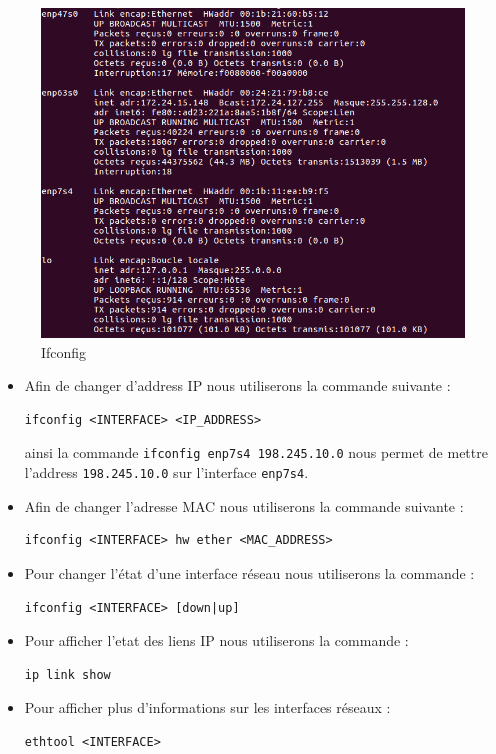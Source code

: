\begin{figure}[H]
\centering
\includegraphics[width=400pt]{./TP1/Pictures/ifconfig}
\caption{Ifconfig}
\label{Ifconfig}
\end{figure}

\begin{itemize}
\item Afin de changer d'address IP nous utiliserons la commande suivante :

\begin{verbatim}
ifconfig <INTERFACE> <IP_ADDRESS>
\end{verbatim}
ainsi la commande \texttt{ifconfig enp7s4 198.245.10.0} nous permet de mettre l'address \texttt{198.245.10.0} sur l'interface \texttt{enp7s4}.

\item Afin de changer l'adresse MAC nous utiliserons la commande suivante :
\begin{verbatim}
ifconfig <INTERFACE> hw ether <MAC_ADDRESS>
\end{verbatim}
\item Pour changer l'état d'une interface réseau nous utiliserons la commande :
\begin{verbatim}
ifconfig <INTERFACE> [down|up]
\end{verbatim}
\item Pour afficher l'etat des liens IP nous utiliserons la commande :
\begin{verbatim}
ip link show
\end{verbatim}
\item Pour afficher plus d'informations sur les interfaces réseaux :
\begin{verbatim}
ethtool <INTERFACE>
\end{verbatim}

\end{itemize}

